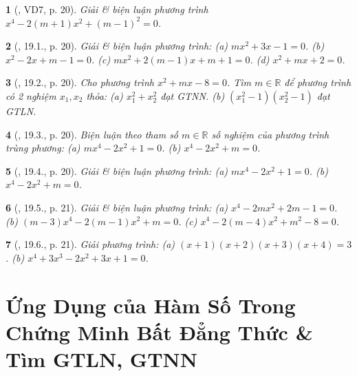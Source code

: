 \documentclass{article}
\newtheorem{baitoan}{}
\begin{document}
\begin{baitoan}[\cite{Hai_Hung_Thu_Tung_ncpt_Toan_10_tap_2}, VD7, p. 20]
	Giải \& biện luận phương trình $x^4 - 2(m + 1)x^2 + (m - 1)^2 = 0$.
\end{baitoan}

\begin{baitoan}[\cite{Hai_Hung_Thu_Tung_ncpt_Toan_10_tap_2}, 19.1., p. 20]
	Giải \& biện luận phương trình: (a) $mx^2 + 3x - 1 = 0$. (b) $x^2 - 2x + m - 1 = 0$. (c) $mx^2 + 2(m - 1)x + m + 1 = 0$. (d) $x^2 + mx + 2 = 0$.
\end{baitoan}

\begin{baitoan}[\cite{Hai_Hung_Thu_Tung_ncpt_Toan_10_tap_2}, 19.2., p. 20]
	Cho phương trình $x^2 + mx - 8 = 0$. Tìm $m\in\mathbb{R}$ để phương trình có 2 nghiệm $x_1,x_2$ thỏa: (a) $x_1^2 + x_2^2$ đạt {\rm GTNN}. (b) $(x_1^2 - 1)(x_2^2 - 1)$ đạt {\rm GTLN}.
\end{baitoan}

\begin{baitoan}[\cite{Hai_Hung_Thu_Tung_ncpt_Toan_10_tap_2}, 19.3., p. 20]
	Biện luận theo tham số $m\in\mathbb{R}$ số nghiệm của phương trình trùng phương: (a) $mx^4 - 2x^2 + 1 = 0$. (b) $x^4 - 2x^2 + m = 0$.
\end{baitoan}

\begin{baitoan}[\cite{Hai_Hung_Thu_Tung_ncpt_Toan_10_tap_2}, 19.4., p. 20]
	Giải \& biện luận phương trình: (a) $mx^4 - 2x^2 + 1 = 0$. (b) $x^4 - 2x^2 + m = 0$.
\end{baitoan}

\begin{baitoan}[\cite{Hai_Hung_Thu_Tung_ncpt_Toan_10_tap_2}, 19.5., p. 21]
	Giải \& biện luận phương trình: (a) $x^4 - 2mx^2 + 2m - 1 = 0$. (b) $(m - 3)x^4 - 2(m - 1)x^2 + m = 0$. (c) $x^4 - 2(m - 4)x^2 + m^2 - 8 = 0$.
\end{baitoan}

\begin{baitoan}[\cite{Hai_Hung_Thu_Tung_ncpt_Toan_10_tap_2}, 19.6., p. 21]
	Giải phương trình: (a) $(x + 1)(x + 2)(x + 3)(x + 4) = 3$. (b) $x^4 + 3x^3 - 2x^2 + 3x + 1 = 0$.
\end{baitoan}


\section{Ứng Dụng của Hàm Số Trong Chứng Minh Bất Đẳng Thức \& Tìm GTLN, GTNN}
\end{document}
